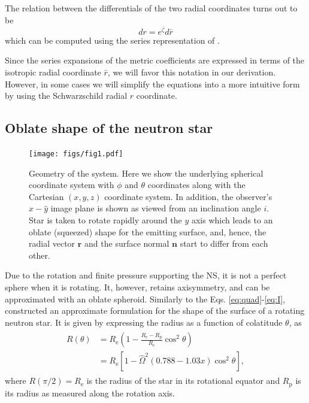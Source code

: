 \documentclass{aa}
\newcommand{\be}{\begin{equation}}
\newcommand{\ee}{\end{equation}}
\renewcommand{\vec}[1]{\ensuremath{\boldsymbol{#1}}}
\newcommand{\refe}[1]{#1}
\newcommand{\refedel}[1]{}
\newcommand{\Req}{\ensuremath{R_{\mathrm{e}}}}
\newcommand{\sch}{Schwarzschild }
\newcommand{\rb}{\ensuremath{\bar{r}}}
\newcommand{\Ob}{\ensuremath{\hat{\Omega}}}
\newcommand{\zetab}{\ensuremath{\bar{\zeta}}}
\begin{document}
\refe{The relation between the differentials of the two radial coordinates turns out to be}
\be\label{eq:drb2dr}
dr = e^{\zetab} d\rb
\ee
which can be computed using the series representation of \cite{BI76}.

Since the series expansions of the metric coefficients \refe{are expressed in terms of} the isotropic radial coordinate $\rb$, we will favor this \refe{notation} in our derivation.  
However, in some cases we will simplify the equations into a more intuitive form by using the \refe{\sch radial} $r$ coordinate.


\subsection{Oblate shape of the neutron star}\label{sect:oblate}

\begin{figure}
\centering
\texttt{[image: figs/fig1.pdf]}
\caption{\label{fig:geom}
Geometry of the system. Here we show the underlying spherical coordinate system with $\phi$ and $\theta$ coordinates along with the Cartesian $(x,y,z)$ coordinate \refe{system}.
In addition, the observer's $\hat{x}-\hat{y}$ image plane is shown as viewed from an inclination angle $i$.
Star is taken to rotate rapidly around the $y$ axis which leads to an oblate (squeezed) shape for the emitting surface, and, hence, the radial vector $\vec{r}$ and the surface normal $\vec{n}$ start to differ from each other.
}
\end{figure}

Due to the rotation and finite pressure supporting the NS, it is not a perfect sphere when it is rotating.  
It, however, retains axisymmetry, and can be approximated with an oblate spheroid.  
Similarly to \refe{the Eqs. \eqref{eq:quad}-\eqref{eq:I},} \citet{aGM14} \refedel{derived}\refe{constructed} an approximate \refe{formulation} for the shape of \refe{the surface of} a rotating neutron star. 
\refe{It is given by} expressing the radius as a function of colatitude $\theta$, as 
\begin{align}\begin{split}\label{eq:radf}
    R(\theta) &= \Req \left( 1 - \frac{\Req - R_{\mathrm{p}}}{\Req} \cos^2\theta \right) \\
              &= \Req [1-\Ob^2 (0.788 - 1.03x) \cos^2 \theta],
\end{split}\end{align}
\refe{where $R(\pi/2) = \Req$ is the radius of the star in its rotational equator and $R_{\mathrm{p}}$ is its radius as measured along the rotation axis.}
\end{document}
